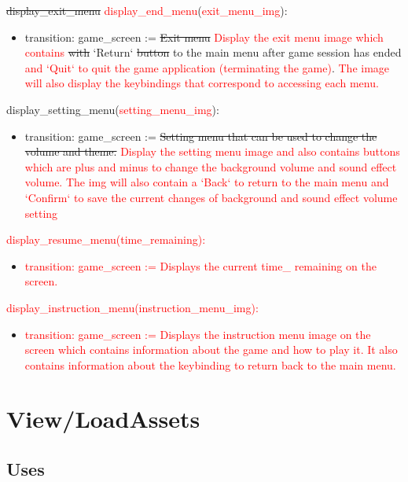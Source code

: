 \documentclass[12pt]{article}
\begin{document}
\noindent \sout{display\_exit\_menu} \textcolor{red}{display\_end\_menu}(\textcolor{red}{exit\_menu\_img}):
\begin{itemize}
    \item transition: game\_screen := \sout{Exit menu} \textcolor{red}{Display the exit menu image which contains} \sout{with} `Return` \sout{button} to the main menu after game session has ended \textcolor{red}{ and `Quit` to quit the game application (terminating the game)}. \textcolor{red}{The image will also display the keybindings that correspond to accessing each menu. }
\end{itemize}

\noindent display\_setting\_menu(\textcolor{red}{setting\_menu\_img}):
\begin{itemize}
    \item transition: game\_screen := \sout{Setting menu that can be used to change the volume and theme.} \textcolor{red}{Display the setting menu image and also contains buttons which are plus and minus to change the background volume and sound effect volume. The img will also contain a `Back` to return to the main menu and `Confirm` to save the current changes of background and sound effect volume setting}
\end{itemize}

\noindent \textcolor{red}{display\_resume\_menu(time\_remaining):}
\begin{itemize}
    \item \textcolor{red}{transition: game\_screen := Displays the current time\_ remaining on the screen.}
\end{itemize}

\noindent \textcolor{red}{display\_instruction\_menu(instruction\_menu\_img):}
\begin{itemize}
    \item \textcolor{red}{transition: game\_screen := Displays the instruction menu image on the screen which contains information about the game and how to play it. It also contains information about the keybinding to return back to the main menu.}
\end{itemize}
\newpage
\section*{View/LoadAssets}

\subsection* {Uses}
\end{document}
